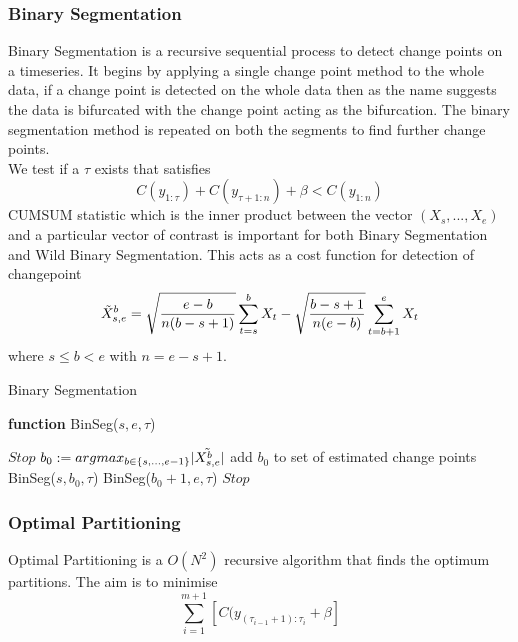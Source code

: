 \documentclass{article}
\begin{document}
\subsubsection{Binary Segmentation}
Binary Segmentation is a recursive sequential process to detect change points on a timeseries. It begins by applying a single change point method to the whole data, if a change point is detected on the whole data then as the name suggests the data is bifurcated with the change point acting as the bifurcation. The binary segmentation method is repeated on both the segments to find further change points. \\
We test if a $\tau$ exists that satisfies 
$$C(y_{1:\tau}) + C(y_{\tau + 1: n}) + \beta < C(y_{1:n})$$
CUMSUM statistic which is the inner product between the vector $(X_{s},...,X_{e})$ and a particular vector of contrast is important for both Binary Segmentation and Wild Binary Segmentation. This acts as a cost function for detection of changepoint
$$\Tilde{X}^{b}_{s,e} = \sqrt{\frac{e-b}{n(b-s+1)}} \sum_{t=s}^{b} X_{t} - \sqrt{\frac{b-s+1}{n(e-b)}}\sum_{t=b+1}^{e}X_{t}$$ where $s \leq b < e $ with $n = e - s + 1$. 


\begin{algorithm}
\caption{Binary Segmentation}\label{alg:cap}
\textbf{function} BinSeg($s,e,\tau$)
\begin{algorithmic}
        \State $Stop$
    \Else
        \State$b_{0} := argmax_{b\in \{s,...,e-1\}} |\Tilde{X_{s,e}^{b}}|$
            \State add $b_0$ to set of estimated change points
            \State BinSeg($s,b_{0},\tau$)
            \State BinSeg($b_{0}+1,e,\tau$)
        \Else
            \State $Stop$
            \EndIf
        \EndIf
\end{algorithmic}
\end{algorithm}
\subsubsection{Optimal Partitioning}
Optimal Partitioning is a $O(N^{2})$ recursive algorithm that finds the optimum partitions. The aim is to minimise 
$$\sum_{i = 1}^{m+1} [C(y_{(\tau_{i-1}+1) : \tau_{i}} + \beta] $$
\end{document}
